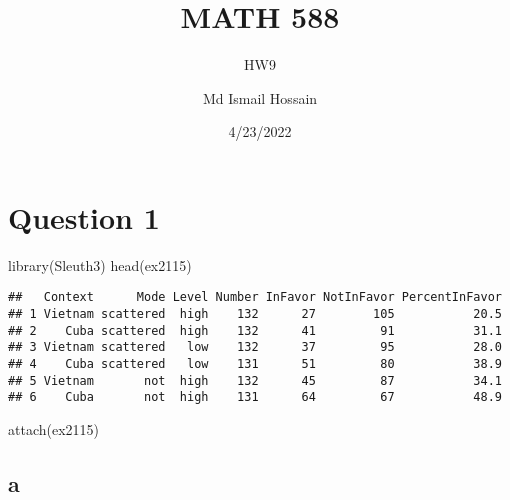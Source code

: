 \documentclass[
]{article}
\title{MATH 588}
\subtitle{HW9}
\author{Md Ismail Hossain}
\date{4/23/2022}
\newenvironment{Shaded}{\begin{snugshade}}{\end{snugshade}}
\newcommand{\AttributeTok}[1]{\textcolor[rgb]{0.77,0.63,0.00}{#1}}
\newcommand{\DecValTok}[1]{\textcolor[rgb]{0.00,0.00,0.81}{#1}}
\newcommand{\FunctionTok}[1]{\textcolor[rgb]{0.00,0.00,0.00}{#1}}
\newcommand{\NormalTok}[1]{#1}
\newcommand{\OtherTok}[1]{\textcolor[rgb]{0.56,0.35,0.01}{#1}}
\newcommand{\SpecialCharTok}[1]{\textcolor[rgb]{0.00,0.00,0.00}{#1}}
\begin{document}
\maketitle

\newpage

\hypertarget{question-1}{%
\section{Question 1}\label{question-1}}

\begin{Shaded}
\begin{Highlighting}[]
\FunctionTok{library}\NormalTok{(Sleuth3)}
\FunctionTok{head}\NormalTok{(ex2115)}
\end{Highlighting}
\end{Shaded}

\begin{verbatim}
##   Context      Mode Level Number InFavor NotInFavor PercentInFavor
## 1 Vietnam scattered  high    132      27        105           20.5
## 2    Cuba scattered  high    132      41         91           31.1
## 3 Vietnam scattered   low    132      37         95           28.0
## 4    Cuba scattered   low    131      51         80           38.9
## 5 Vietnam       not  high    132      45         87           34.1
## 6    Cuba       not  high    131      64         67           48.9
\end{verbatim}

\begin{Shaded}
\begin{Highlighting}[]
\FunctionTok{attach}\NormalTok{(ex2115)}
\end{Highlighting}
\end{Shaded}

\hypertarget{a}{%
\subsection{a}\label{a}}

\begin{Shaded}
\end{Shaded}
\end{document}
